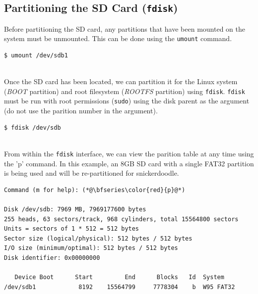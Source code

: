 \subsection{Partitioning the SD Card (\texttt{fdisk})}
Before partitioning the SD card, any partitions that have been mounted on the system must be unmounted. This can be done using the \texttt{umount} command. \\

\begin{lstlisting}
$ umount /dev/sdb1
\end{lstlisting}

~\\
\noindent
Once the SD card has been located, we can partition it for the Linux system (\textit{BOOT} partition) and root filesystem (\textit{ROOTFS} partition) using \texttt{fdisk}. \texttt{fdisk} must be run with root permissions (\texttt{sudo}) using the disk parent as the argument (do not use the parition number in the argument).\\ 


\begin{lstlisting}[language=bash]
$ fdisk /dev/sdb
\end{lstlisting}

~\\
\noindent
From within the \texttt{fdisk} interface, we can view the parition table at any time using the 'p' command. In this example, an 8GB SD card with a single FAT32 partition is being used and will be re-partitioned for snickerdoodle. \\

\begin{lstlisting}[style=text]
Command (m for help): (*@\bfseries\color{red}{p}@*)

Disk /dev/sdb: 7969 MB, 7969177600 bytes
255 heads, 63 sectors/track, 968 cylinders, total 15564800 sectors
Units = sectors of 1 * 512 = 512 bytes
Sector size (logical/physical): 512 bytes / 512 bytes
I/O size (minimum/optimal): 512 bytes / 512 bytes
Disk identifier: 0x00000000

   Device Boot      Start         End      Blocks   Id  System
/dev/sdb1            8192    15564799     7778304    b  W95 FAT32
\end{lstlisting}


